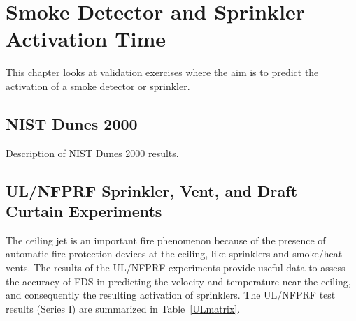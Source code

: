 
\chapter{Smoke Detector and Sprinkler Activation Time}

This chapter looks at validation exercises where the aim is to predict the activation of a smoke detector or sprinkler.

\section{NIST Dunes 2000}
\label{NIST_Dunes_2000_Results}

Description of NIST Dunes 2000 results.


\clearpage


\section{UL/NFPRF Sprinkler, Vent, and Draft Curtain Experiments}
\label{UL_NFPRF:Results}

The ceiling jet is an important fire phenomenon because of the presence of automatic fire protection devices at the ceiling, like
sprinklers and smoke/heat vents. The results of the UL/NFPRF experiments provide useful data to assess the accuracy of FDS in predicting
the velocity and temperature near the ceiling, and consequently the resulting activation of sprinklers.
The UL/NFPRF test results (Series I) are summarized in Table~\ref{ULmatrix}.

